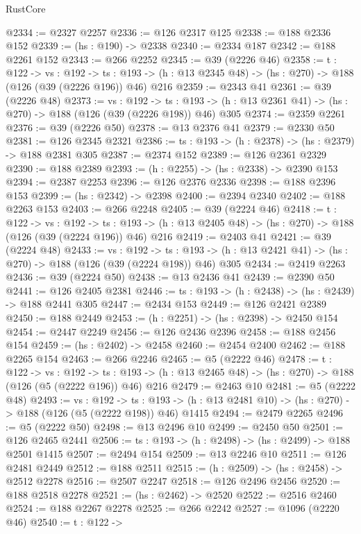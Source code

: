 \begin{lexlean}{RustCore}
\begin{coremodule}
@2334 := @2327 @2257
@2336 := @126 @2317 @125
@2338 := @188 @2336 @152
@2339 := (hs : @190) -> @2338
@2340 := @2334 @187
@2342 := @188 @2261 @152
@2343 := @266 @2252
@2345 := @39 (@2226 @46)
@2358 := {t : @122} ->
  {vs : @192} ->
  {ts : @193} -> (h : @13 @2345 @48) -> (hs : @270) -> @188 (@126 (@39 (@2226 @196)) @46) @216
@2359 := @2343 @41
@2361 := @39 (@2226 @48)
@2373 := {vs : @192} ->
  {ts : @193} -> (h : @13 @2361 @41) -> (hs : @270) -> @188 (@126 (@39 (@2226 @198)) @46) @305
@2374 := @2359 @2261
@2376 := @39 (@2226 @50)
@2378 := @13 @2376 @41
@2379 := @2330 @50
@2381 := @126 @2345 @2321
@2386 := {ts : @193} -> (h : @2378) -> (hs : @2379) -> @188 @2381 @305
@2387 := @2374 @152
@2389 := @126 @2361 @2329
@2390 := @188 @2389
@2393 := (h : @2255) -> (hs : @2338) -> @2390 @153
@2394 := @2387 @2253
@2396 := @126 @2376 @2336
@2398 := @188 @2396 @153
@2399 := (hs : @2342) -> @2398
@2400 := @2394 @2340
@2402 := @188 @2263 @153
@2403 := @266 @2248
@2405 := @39 (@2224 @46)
@2418 := {t : @122} ->
  {vs : @192} ->
  {ts : @193} -> (h : @13 @2405 @48) -> (hs : @270) -> @188 (@126 (@39 (@2224 @196)) @46) @216
@2419 := @2403 @41
@2421 := @39 (@2224 @48)
@2433 := {vs : @192} ->
  {ts : @193} -> (h : @13 @2421 @41) -> (hs : @270) -> @188 (@126 (@39 (@2224 @198)) @46) @305
@2434 := @2419 @2263
@2436 := @39 (@2224 @50)
@2438 := @13 @2436 @41
@2439 := @2390 @50
@2441 := @126 @2405 @2381
@2446 := {ts : @193} -> (h : @2438) -> (hs : @2439) -> @188 @2441 @305
@2447 := @2434 @153
@2449 := @126 @2421 @2389
@2450 := @188 @2449
@2453 := (h : @2251) -> (hs : @2398) -> @2450 @154
@2454 := @2447 @2249
@2456 := @126 @2436 @2396
@2458 := @188 @2456 @154
@2459 := (hs : @2402) -> @2458
@2460 := @2454 @2400
@2462 := @188 @2265 @154
@2463 := @266 @2246
@2465 := @5 (@2222 @46)
@2478 := {t : @122} ->
  {vs : @192} ->
  {ts : @193} -> (h : @13 @2465 @48) -> (hs : @270) -> @188 (@126 (@5 (@2222 @196)) @46) @216
@2479 := @2463 @10
@2481 := @5 (@2222 @48)
@2493 := {vs : @192} ->
  {ts : @193} -> (h : @13 @2481 @10) -> (hs : @270) -> @188 (@126 (@5 (@2222 @198)) @46) @1415
@2494 := @2479 @2265
@2496 := @5 (@2222 @50)
@2498 := @13 @2496 @10
@2499 := @2450 @50
@2501 := @126 @2465 @2441
@2506 := {ts : @193} -> (h : @2498) -> (hs : @2499) -> @188 @2501 @1415
@2507 := @2494 @154
@2509 := @13 @2246 @10
@2511 := @126 @2481 @2449
@2512 := @188 @2511
@2515 := (h : @2509) -> (hs : @2458) -> @2512 @2278
@2516 := @2507 @2247
@2518 := @126 @2496 @2456
@2520 := @188 @2518 @2278
@2521 := (hs : @2462) -> @2520
@2522 := @2516 @2460
@2524 := @188 @2267 @2278
@2525 := @266 @2242
@2527 := @1096 (@2220 @46)
@2540 := {t : @122} ->

\end{coremodule}
\end{lexlean}
